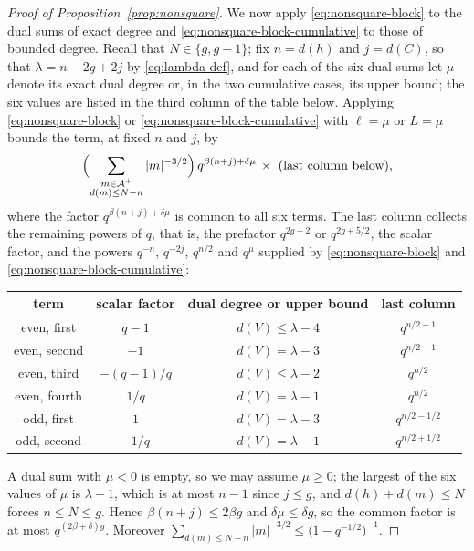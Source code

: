 \documentclass[a4paper,reqno]{amsart}
\numberwithin{equation}{section}
\theoremstyle{remark}
\theoremstyle{definition}
\newcommand{\A}{\mathcal{A}}
\begin{document}
\begin{proof}[Proof of Proposition~\ref{prop:nonsquare}]
We now apply \eqref{eq:nonsquare-block} to the dual sums of exact degree and
\eqref{eq:nonsquare-block-cumulative} to those of bounded degree. Recall that
$N\in\{g,g-1\}$; fix $n=d(h)$ and $j=d(C)$, so that $\lambda=n-2g+2j$ by
\eqref{eq:lambda-def}, and for each of the six dual sums let $\mu$ denote
its exact dual degree or, in the two cumulative cases, its upper bound; the
six values are listed in the third column of the table below. Applying
\eqref{eq:nonsquare-block} or \eqref{eq:nonsquare-block-cumulative} with
$\ell=\mu$ or $L=\mu$ bounds the term, at fixed $n$ and $j$, by
$$
\Bigl(\sum_{\substack{m\in\A^+\\ d(m)\le N-n}}|m|^{-3/2}\Bigr)
\,
q^{\beta(n+j)+\delta\mu}
\,
\times
\ \text{(last column below)},
$$
where the factor $q^{\beta(n+j)+\delta\mu}$ is common to all six terms.
The last column collects the remaining powers of $q$, that is, the
prefactor $q^{2g+2}$ or $q^{2g+5/2}$, the scalar factor, and the powers
$q^{-n}$, $q^{-2j}$, $q^{n/2}$ and $q^{\mu}$ supplied by
\eqref{eq:nonsquare-block} and \eqref{eq:nonsquare-block-cumulative}:
\begin{center}
\renewcommand{\arraystretch}{1.25}
\begin{tabular}{c c c c}
term & scalar factor & dual degree or upper bound & last column\\
\hline
even, first
& $q-1$
& $d(V)\le\lambda-4$
& $q^{n/2-1}$\\

even, second
& $-1$
& $d(V)=\lambda-3$
& $q^{n/2-1}$\\

even, third
& $-(q-1)/q$
& $d(V)\le\lambda-2$
& $q^{n/2}$\\

even, fourth
& $1/q$
& $d(V)=\lambda-1$
& $q^{n/2}$\\

odd, first
& $1$
& $d(V)=\lambda-3$
& $q^{n/2-1/2}$\\

odd, second
& $-1/q$
& $d(V)=\lambda-1$
& $q^{n/2+1/2}$
\end{tabular}
\end{center}

A dual sum with $\mu<0$ is empty, so we may assume $\mu\ge0$; the
largest of the six values of $\mu$ is $\lambda-1$, which is at most
$n-1$ since $j\le g$, and $d(h)+d(m)\le N$ forces $n\le N\le g$. Hence
$\beta(n+j)\le2\beta g$ and $\delta\mu\le\delta g$, so the common factor
is at most $q^{(2\beta+\delta)g}$. Moreover
$\sum_{d(m)\le N-n}|m|^{-3/2}\le\bigl(1-q^{-1/2}\bigr)^{-1}$.


\end{proof}
\end{document}

